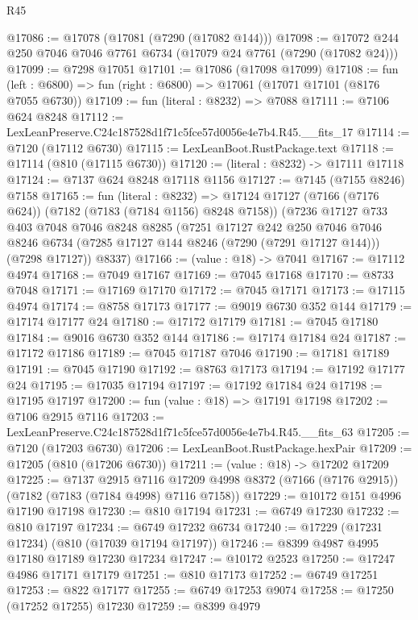\begin{lexlean}{R45}
\begin{coremodule}
{@17086 := @17078 (@17081 (@7290 (@17082 @144)))
@17098 := @17072 @244 @250 @7046 @7046 @7761 @6734 (@17079 @24 @7761 (@7290 (@17082 @24)))
@17099 := @7298 @17051
@17101 := @17086 (@17098 @17099)
@17108 := fun (left : @6800) => fun (right : @6800) => @17061 (@17071 @17101 (@8176 @7055 @6730))
@17109 := fun (literal : @8232) => @7088
@17111 := @7106 @624 @8248
@17112 := LexLeanPreserve.C24c187528d1f71c5fce57d0056e4e7b4.R45.__fits_17
@17114 := @7120 (@17112 @6730)
@17115 := LexLeanBoot.RustPackage.text
@17118 := @17114 (@810 (@17115 @6730))
@17120 := (literal : @8232) -> @17111 @17118
@17124 := @7137 @624 @8248 @17118 @1156
@17127 := @7145 (@7155 @8246) @7158
@17165 := fun (literal : @8232) =>
  @17124
    @17127
    (@7166 (@7176 @624))
    (@7182 (@7183 (@7184 @1156) @8248 @7158))
    (@7236
      @17127
      @733
      @403
      @7048
      @7046
      @8248
      @8285
      (@7251
        @17127
        @242
        @250
        @7046
        @7046
        @8246
        @6734
        (@7285 @17127 @144 @8246 (@7290 (@7291 @17127 @144)))
        (@7298 @17127))
      @8337)
@17166 := (value : @18) -> @7041
@17167 := @17112 @4974
@17168 := @7049 @17167
@17169 := @7045 @17168
@17170 := @8733 @7048
@17171 := @17169 @17170
@17172 := @7045 @17171
@17173 := @17115 @4974
@17174 := @8758 @17173
@17177 := @9019 @6730 @352 @144
@17179 := @17174 @17177 @24
@17180 := @17172 @17179
@17181 := @7045 @17180
@17184 := @9016 @6730 @352 @144
@17186 := @17174 @17184 @24
@17187 := @17172 @17186
@17189 := @7045 @17187 @7046
@17190 := @17181 @17189
@17191 := @7045 @17190
@17192 := @8763 @17173
@17194 := @17192 @17177 @24
@17195 := @17035 @17194
@17197 := @17192 @17184 @24
@17198 := @17195 @17197
@17200 := fun (value : @18) => @17191 @17198
@17202 := @7106 @2915 @7116
@17203 := LexLeanPreserve.C24c187528d1f71c5fce57d0056e4e7b4.R45.__fits_63
@17205 := @7120 (@17203 @6730)
@17206 := LexLeanBoot.RustPackage.hexPair
@17209 := @17205 (@810 (@17206 @6730))
@17211 := (value : @18) -> @17202 @17209
@17225 := @7137
    @2915
    @7116
    @17209
    @4998
    @8372
    (@7166 (@7176 @2915))
    (@7182 (@7183 (@7184 @4998) @7116 @7158))
@17229 := @10172 @151 @4996 @17190 @17198
@17230 := @810 @17194
@17231 := @6749 @17230
@17232 := @810 @17197
@17234 := @6749 @17232 @6734
@17240 := @17229 (@17231 @17234) (@810 (@17039 @17194 @17197))
@17246 := @8399 @4987 @4995 @17180 @17189 @17230 @17234
@17247 := @10172 @2523
@17250 := @17247 @4986 @17171 @17179
@17251 := @810 @17173
@17252 := @6749 @17251
@17253 := @822 @17177
@17255 := @6749 @17253 @9074
@17258 := @17250 (@17252 @17255) @17230
@17259 := @8399 @4979
}
\end{coremodule}
\end{lexlean}
